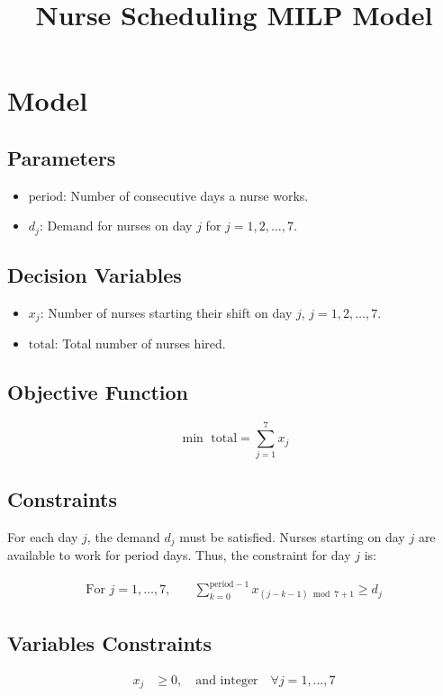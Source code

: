 \documentclass{article}
\begin{document}
\title{Nurse Scheduling MILP Model}
\author{}
\date{}
\maketitle

\section*{Model}

\subsection*{Parameters}
\begin{itemize}
    \item \( \text{period} \): Number of consecutive days a nurse works.
    \item \( d_j \): Demand for nurses on day \( j \) for \( j = 1, 2, \ldots, 7 \).
\end{itemize}

\subsection*{Decision Variables}
\begin{itemize}
    \item \( x_j \): Number of nurses starting their shift on day \( j \), \( j = 1, 2, \ldots, 7 \).
    \item \( \text{total} \): Total number of nurses hired.
\end{itemize}

\subsection*{Objective Function}
\[
\min \text{ total} = \sum_{j=1}^{7} x_j
\]

\subsection*{Constraints}

For each day \( j \), the demand \( d_j \) must be satisfied. Nurses starting on day \( j \) are available to work for \( \text{period} \) days. Thus, the constraint for day \( j \) is:

\begin{align*}
\text{For } j = 1, \ldots, 7, \quad & \sum_{k=0}^{\text{period}-1} x_{(j-k-1) \bmod 7 + 1} \geq d_j
\end{align*}

\subsection*{Variables Constraints}
\begin{align*}
x_j & \geq 0, \quad \text{and integer} \quad \forall j = 1, \ldots, 7
\end{align*}
\end{document}
